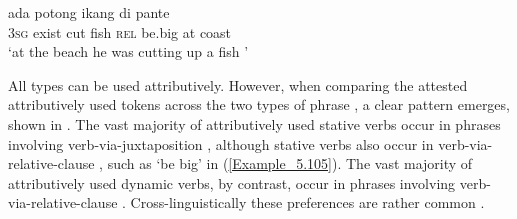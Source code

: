 \ea
\label{Example_5.105}
 {ada} {potong} {ikang} {} {} {di} {pante}\\ %
 \textsc{3sg}  exist  cut  fish  \textsc{rel}  be.big  at  coast\\
\glt 
‘at the beach he was cutting up a fish ’ \textstyleExampleSource{[080919-004-NP.0061]}
\z


All  types can be used attributively. However, when comparing the attested attributively used  tokens across the two types of  phrase , a clear pattern emerges, shown in . The vast majority of attributively used  stative verbs occur in  phrases involving verb-via-juxtapos\-ition , although stative verbs also occur in verb-via-relative-clause , such as  ‘be big’ in (\ref{Example_5.105}). The vast majority of attributively used dynamic verbs, by contrast, occur in  phrases involving verb-via-relative-clause . Cross-linguistically these preferences are rather common \citep[31]{Dixon.1994}.





